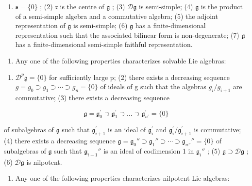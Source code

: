 \begin{enumerate}
\def\labelenumi{(\arabic{enumi})}
\tightlist
\item
  \(\mathfrak{s} = \{0\}\) ; (2) \(\mathfrak{r}\) is the centre of \(\mathfrak{g}\) ; (3) \(\mathcal{D}\mathfrak{g}\) is semi-simple; (4) \(\mathfrak{g}\) is the product of a semi-simple algebra and a commutative algebra; (5) the adjoint representation of \(\mathfrak{g}\) is semi-simple; (6) \(\mathfrak{g}\) has a finite-dimensional representation such that the associated bilinear form is non-degenerate; (7) \(\mathfrak{g}\) has a finite-dimensional semi-simple faithful representation.
\end{enumerate}

\begin{enumerate}
\def\labelenumi{(\Roman{enumi})}
\setcounter{enumi}{2}
\tightlist
\item
  Any one of the following properties characterizes solvable Lie algebras:
\end{enumerate}

\begin{enumerate}
\def\labelenumi{(\arabic{enumi})}
\tightlist
\item
  \(\mathcal{D}^{p}\mathfrak{g} = \{0\}\) for sufficiently large p; (2) there exists a decreasing sequence \(g = g_{0} \supset g_{1} \supset \cdots \supset g_{n} = \{0\}\) of ideals of g such that the algebras \(g_{i}/g_{i+1}\) are commutative; (3) there exists a decreasing sequence
\end{enumerate}

\[
\mathfrak {g} = \mathfrak {g} _ {0} ^ {\prime} \supset \mathfrak {g} _ {1} ^ {\prime} \supset \dots \supset \mathfrak {g} _ {n ^ {\prime}} ^ {\prime} = \{0 \}
\]

of subalgebras of \(\mathfrak{g}\) such that \(\mathfrak{g}_{i+1}^{\prime}\) is an ideal of \(\mathfrak{g}_i^{\prime}\) and \(\mathfrak{g}_i^{\prime}/\mathfrak{g}_{i+1}^{\prime}\) is commutative; (4) there exists a decreasing sequence \(\mathfrak{g} = \mathfrak{g}_0'' \supset \mathfrak{g}_1'' \supset \cdots \supset \mathfrak{g}_{n''}'' = \{0\}\) of subalgebras of \(\mathfrak{g}\) such that \(\mathfrak{g}_{i+1}''\) is an ideal of codimension 1 in \(\mathfrak{g}_i''\) ; (5) \(\mathfrak{g} \supset \mathcal{D}\mathfrak{g}\) ; (6) \(\mathcal{D}\mathfrak{g}\) is nilpotent.

\begin{enumerate}
\def\labelenumi{(\Roman{enumi})}
\setcounter{enumi}{3}
\tightlist
\item
  Any one of the following properties characterizes nilpotent Lie algebras:
\end{enumerate}

